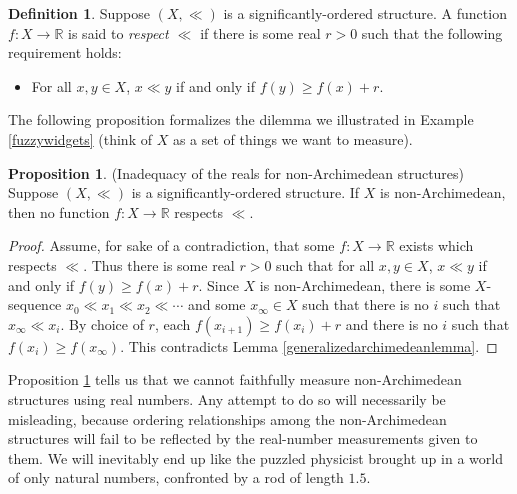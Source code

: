 \documentclass[reqno]{article}
\theoremstyle{definition}
\newtheorem{proposition}[theorem]{Proposition}
\newtheorem{definition}{Definition}
\begin{document}
\begin{definition}
    Suppose $(X,\ll)$ is a significantly-ordered structure.
    A function $f:X\to\mathbb R$ is said to \emph{respect $\ll$}
    if there is some real $r>0$ such that the following requirement holds:
    \begin{itemize}
        \item
        For all $x,y\in X$, $x\ll y$ if and only if
        $f(y)\geq f(x)+r$.
    \end{itemize}
\end{definition}

The following proposition formalizes the dilemma we illustrated in
Example \ref{fuzzywidgets} (think of $X$ as a set of things we
want to measure).

\begin{proposition}
\label{maindilemma}
(Inadequacy of the reals for non-Archimedean structures)
    Suppose $(X,\ll)$ is a significantly-ordered structure.
    If $X$ is non-Archimedean, then no function $f:X\to\mathbb R$
    respects $\ll$.
\end{proposition}

\begin{proof}
    Assume, for sake of a contradiction, that some $f:X\to\mathbb R$
    exists which respects $\ll$. Thus there is some real $r>0$ such that
    for all $x,y\in X$, $x\ll y$ if and only if $f(y)\geq f(x)+r$.
    Since $X$ is non-Archimedean, there is some $X$-sequence
    $x_0\ll x_1\ll x_2\ll\cdots$ and some $x_\infty\in X$
    such that there is no $i$ such that $x_\infty\ll x_i$.
    By choice of $r$, each $f(x_{i+1})\geq f(x_i)+r$ and there is no
    $i$ such that $f(x_i)\geq f(x_\infty)$.
    This contradicts Lemma \ref{generalizedarchimedeanlemma}.
\end{proof}

Proposition \ref{maindilemma} tells us that we cannot faithfully measure
non-Archimedean structures using real numbers.
Any attempt to do so will necessarily be misleading, because ordering
relationships among the non-Archimedean structures will fail to be reflected
by the real-number measurements given to them.
We will inevitably end up like the puzzled physicist
brought up in a world of only natural numbers, confronted by a rod of
length $1.5$.
\end{document}

